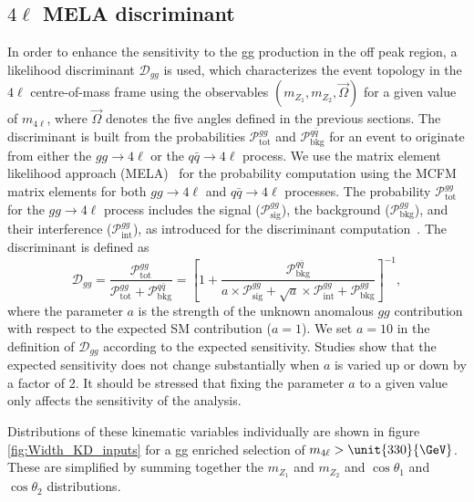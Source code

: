 \subsection{$4\ell$ MELA discriminant}
\label{sec:MELA_gg}

In order to enhance the sensitivity to the gg production in the off peak region, a likelihood discriminant
$\mathcal{D}_{gg}$ is used, which characterizes the event topology in the $4\ell$ centre-of-mass frame
using the observables $(m_{Z_1}, m_{Z_2}, \vec\Omega)$ for a given value of $m_{4\ell}$, where
$\vec\Omega$ denotes the five angles defined in the previous sections. The discriminant is built from the
probabilities $\mathcal{P}^{gg}_\text{tot}$ and $\mathcal{P}^{q\bar{q}}_\text{bkg}$
for an event to originate from either the $gg \to 4\ell$ or the $q\bar{q} \to 4\ell$
process. We use the matrix element likelihood approach (MELA)~\cite{Chatrchyan:2012ufa, Bolognesi:2012mm}
for the probability computation using the \textsc{MCFM} matrix elements for both $gg \to 4\ell$ and
$q\bar{q} \to 4\ell$ processes.
The probability $\mathcal{P}^{gg}_\text{tot}$ for the $gg \to 4\ell$ process includes
the signal ($\mathcal{P}^{gg}_\text{sig}$), the background ($\mathcal{P}^{gg}_\text{bkg}$),
and their interference ($\mathcal{P}^{gg}_\text{int}$), as introduced for the discriminant computation~\cite{Anderson:2013afp}. The discriminant is defined as
\begin{equation}
\label{eq:kd-ggmela}
\mathcal{D}_{gg} = \frac{\mathcal{P}^{gg}_\text{tot}  }{\mathcal{P}^{gg}_\text{tot}  + \mathcal{P}^{q\bar{q}}_\text{bkg} }=
\left[1+\frac{\mathcal{P}^{q\bar{q}}_\text{bkg}  }
{a \times \mathcal{P}^{gg}_\text{sig} +  \sqrt{a} \times  \mathcal{P}^{gg}_\text{int} + \mathcal{P}^{gg}_\text{bkg}  } \right]^{-1} ,
\end{equation}
where
the parameter $a$ is the strength of the unknown anomalous $gg$ contribution with respect to the
expected SM contribution ($a=1$). We set $a = 10$ in the definition of $\mathcal{D}_{gg}$ according
to the expected sensitivity. Studies show that the expected sensitivity does not change substantially
when $a$ is varied up or down by a factor of 2. It should be stressed that fixing the parameter $a$ to
a given value only affects the sensitivity of the analysis. 

Distributions of these kinematic variables individually are shown in figure \ref{fig:Width_KD_inputs} for a gg enriched selection of $m_{4\ell} > \unit{330}{\GeV}$. These are simplified by summing together the $m_{Z_{1}}$ and $m_{Z_{2}}$ and $\cos\theta_{1}$ and $\cos\theta_{2}$ distributions.

